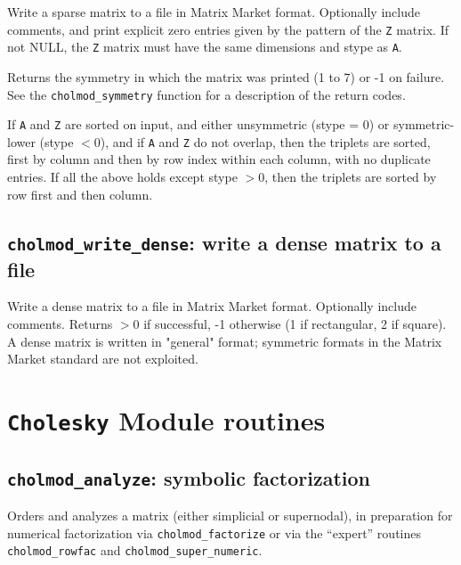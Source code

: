 \documentclass[11pt]{article}
\begin{document}

Write a sparse matrix to a file in Matrix Market format.   Optionally include
comments, and print explicit zero entries given by the pattern of the {\tt Z}
matrix.  If not NULL, the {\tt Z} matrix must have the same dimensions and stype
as {\tt A}.

Returns the symmetry in which the matrix was printed (1 to 7) or -1 on failure.
See the {\tt cholmod\_symmetry} function for a description of the return codes.

If {\tt A} and {\tt Z} are sorted on input, and either unsymmetric (stype = 0)
or symmetric-lower (stype $< 0$), and if {\tt A} and {\tt Z} do not overlap,
then the triplets are sorted, first by column and then by row index within each
column, with no duplicate entries.  If all the above holds except stype $> 0$,
then the triplets are sorted by row first and then column.

\subsection{{\tt cholmod\_write\_dense}: write a dense matrix to a file}


Write a dense matrix to a file in Matrix Market format.   Optionally include
comments.  Returns $> 0$ if successful, -1 otherwise (1 if rectangular, 2 if
square).  A dense matrix is written in "general" format; symmetric formats in
the Matrix Market standard are not exploited.

\newpage \section{{\tt Cholesky} Module routines}

\subsection{{\tt cholmod\_analyze}: symbolic factorization}


Orders and analyzes a matrix (either simplicial or supernodal), in preparation
for numerical factorization via {\tt cholmod\_factorize} or via the ``expert''
routines {\tt cholmod\_rowfac} and {\tt cholmod\_super\_numeric}.
\end{document}
